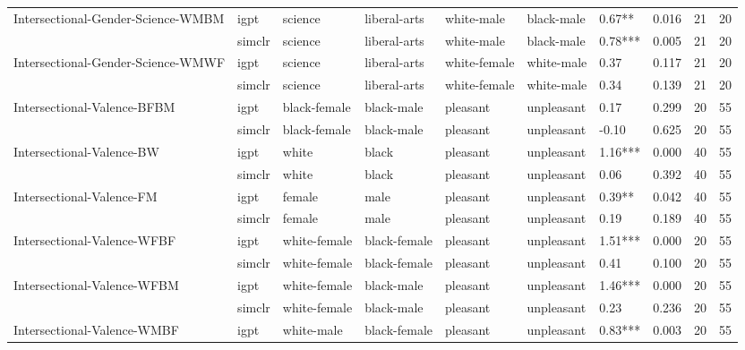\begin{tabular}{llllllllll}
Intersectional-Gender-Science-WMBM & igpt &       science &  liberal-arts &    white-male &    black-male &   0.67** &  0.016 &    21 &    20 \\
                            & simclr &       science &  liberal-arts &    white-male &    black-male &  0.78*** &  0.005 &    21 &    20 \\
Intersectional-Gender-Science-WMWF & igpt &       science &  liberal-arts &  white-female &    white-male &     0.37 &  0.117 &    21 &    20 \\
                            & simclr &       science &  liberal-arts &  white-female &    white-male &     0.34 &  0.139 &    21 &    20 \\
Intersectional-Valence-BFBM & igpt &  black-female &    black-male &      pleasant &    unpleasant &     0.17 &  0.299 &    20 &    55 \\
                            & simclr &  black-female &    black-male &      pleasant &    unpleasant &    -0.10 &  0.625 &    20 &    55 \\
Intersectional-Valence-BW & igpt &         white &         black &      pleasant &    unpleasant &  1.16*** &  0.000 &    40 &    55 \\
                            & simclr &         white &         black &      pleasant &    unpleasant &     0.06 &  0.392 &    40 &    55 \\
Intersectional-Valence-FM & igpt &        female &          male &      pleasant &    unpleasant &   0.39** &  0.042 &    40 &    55 \\
                            & simclr &        female &          male &      pleasant &    unpleasant &     0.19 &  0.189 &    40 &    55 \\
Intersectional-Valence-WFBF & igpt &  white-female &  black-female &      pleasant &    unpleasant &  1.51*** &  0.000 &    20 &    55 \\
                            & simclr &  white-female &  black-female &      pleasant &    unpleasant &     0.41 &  0.100 &    20 &    55 \\
Intersectional-Valence-WFBM & igpt &  white-female &    black-male &      pleasant &    unpleasant &  1.46*** &  0.000 &    20 &    55 \\
                            & simclr &  white-female &    black-male &      pleasant &    unpleasant &     0.23 &  0.236 &    20 &    55 \\
Intersectional-Valence-WMBF & igpt &    white-male &  black-female &      pleasant &    unpleasant &  0.83*** &  0.003 &    20 &    55 \\

\end{tabular}
